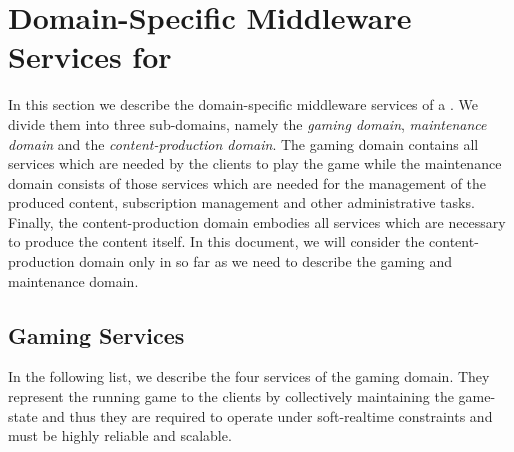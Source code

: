 \documentclass[a4paper, 10pt]{book}
\begin{document}
            \section{Domain-Specific Middleware Services for \MMORGS}


            In this section we describe the domain-specific middleware services of
            a \MMORG. We divide them into three sub-domains, namely the
            \emph{gaming domain}, \emph{maintenance domain} and the
            \emph{content-production domain}.
            The gaming domain contains all services which are needed by the
            clients to play the game while the maintenance domain consists of
            those services which are needed for the management of the produced
            content, subscription management and other administrative tasks.
            Finally, the content-production domain embodies all services which are
            necessary to produce the content itself. In this document, we will 
            consider the content-production domain only in so far as we need to describe
            the gaming and maintenance domain.

            \subsection{Gaming Services}

            In the following list, we describe the four services of the gaming
            domain. They represent the running game to the clients by collectively
            maintaining the game-state and thus they are required to operate under
            soft-realtime constraints and must be highly reliable and scalable. 
\end{document}
